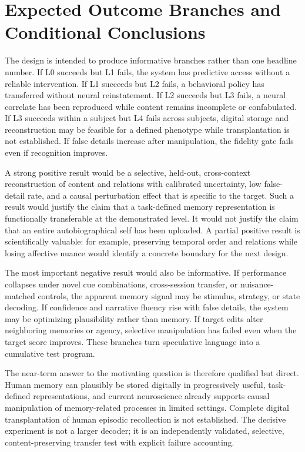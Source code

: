 \documentclass[conference]{IEEEtran}
\begin{document}
\section{Expected Outcome Branches and Conditional Conclusions}
The design is intended to produce informative branches rather than one headline number. If L0 succeeds but L1 fails, the system has predictive access without a reliable intervention. If L1 succeeds but L2 fails, a behavioral policy has transferred without neural reinstatement. If L2 succeeds but L3 fails, a neural correlate has been reproduced while content remains incomplete or confabulated. If L3 succeeds within a subject but L4 fails across subjects, digital storage and reconstruction may be feasible for a defined phenotype while transplantation is not established. If false details increase after manipulation, the fidelity gate fails even if recognition improves.

A strong positive result would be a selective, held-out, cross-context reconstruction of content and relations with calibrated uncertainty, low false-detail rate, and a causal perturbation effect that is specific to the target. Such a result would justify the claim that a task-defined memory representation is functionally transferable at the demonstrated level. It would not justify the claim that an entire autobiographical self has been uploaded. A partial positive result is scientifically valuable: for example, preserving temporal order and relations while losing affective nuance would identify a concrete boundary for the next design.

The most important negative result would also be informative. If performance collapses under novel cue combinations, cross-session transfer, or nuisance-matched controls, the apparent memory signal may be stimulus, strategy, or state decoding. If confidence and narrative fluency rise with false details, the system may be optimizing plausibility rather than memory. If target edits alter neighboring memories or agency, selective manipulation has failed even when the target score improves. These branches turn speculative language into a cumulative test program.

The near-term answer to the motivating question is therefore qualified but direct. Human memory can plausibly be stored digitally in progressively useful, task-defined representations, and current neuroscience already supports causal manipulation of memory-related processes in limited settings. Complete digital transplantation of human episodic recollection is not established. The decisive experiment is not a larger decoder; it is an independently validated, selective, content-preserving transfer test with explicit failure accounting.
\end{document}
